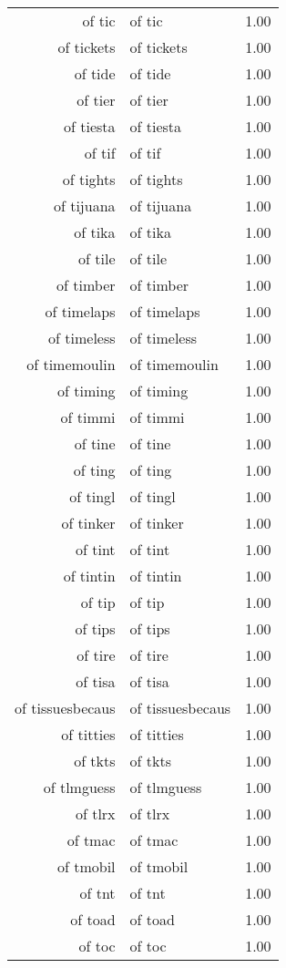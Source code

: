 \begin{table}[ht]
\begin{tabular}{rlr}
  of tic & of tic & 1.00 \\ 
  of tickets & of tickets & 1.00 \\ 
  of tide & of tide & 1.00 \\ 
  of tier & of tier & 1.00 \\ 
  of tiesta & of tiesta & 1.00 \\ 
  of tif & of tif & 1.00 \\ 
  of tights & of tights & 1.00 \\ 
  of tijuana & of tijuana & 1.00 \\ 
  of tika & of tika & 1.00 \\ 
  of tile & of tile & 1.00 \\ 
  of timber & of timber & 1.00 \\ 
  of timelaps & of timelaps & 1.00 \\ 
  of timeless & of timeless & 1.00 \\ 
  of timemoulin & of timemoulin & 1.00 \\ 
  of timing & of timing & 1.00 \\ 
  of timmi & of timmi & 1.00 \\ 
  of tine & of tine & 1.00 \\ 
  of ting & of ting & 1.00 \\ 
  of tingl & of tingl & 1.00 \\ 
  of tinker & of tinker & 1.00 \\ 
  of tint & of tint & 1.00 \\ 
  of tintin & of tintin & 1.00 \\ 
  of tip & of tip & 1.00 \\ 
  of tips & of tips & 1.00 \\ 
  of tire & of tire & 1.00 \\ 
  of tisa & of tisa & 1.00 \\ 
  of tissuesbecaus & of tissuesbecaus & 1.00 \\ 
  of titties & of titties & 1.00 \\ 
  of tkts & of tkts & 1.00 \\ 
  of tlmguess & of tlmguess & 1.00 \\ 
  of tlrx & of tlrx & 1.00 \\ 
  of tmac & of tmac & 1.00 \\ 
  of tmobil & of tmobil & 1.00 \\ 
  of tnt & of tnt & 1.00 \\ 
  of toad & of toad & 1.00 \\ 
  of toc & of toc & 1.00 \\ 

\end{tabular}
\end{table}
